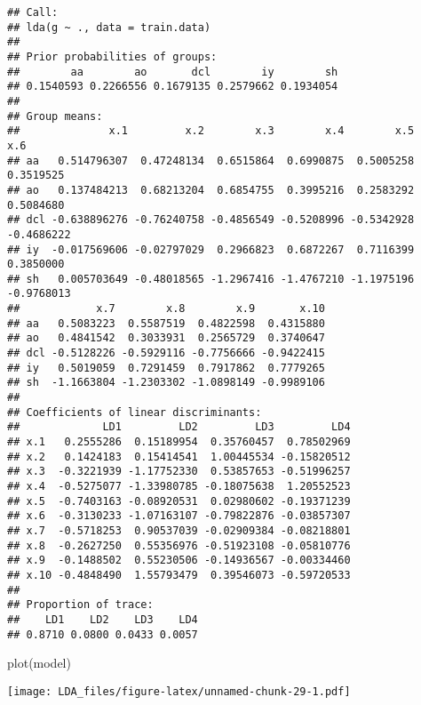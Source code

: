 \documentclass[
]{article}
\newenvironment{Shaded}{\begin{snugshade}}{\end{snugshade}}
\newcommand{\AttributeTok}[1]{\textcolor[rgb]{0.77,0.63,0.00}{#1}}
\newcommand{\DecValTok}[1]{\textcolor[rgb]{0.00,0.00,0.81}{#1}}
\newcommand{\DocumentationTok}[1]{\textcolor[rgb]{0.56,0.35,0.01}{\textbf{\textit{#1}}}}
\newcommand{\FunctionTok}[1]{\textcolor[rgb]{0.00,0.00,0.00}{#1}}
\newcommand{\NormalTok}[1]{#1}
\newcommand{\OtherTok}[1]{\textcolor[rgb]{0.56,0.35,0.01}{#1}}
\newcommand{\SpecialCharTok}[1]{\textcolor[rgb]{0.00,0.00,0.00}{#1}}
\begin{document}
\begin{verbatim}
## Call:
## lda(g ~ ., data = train.data)
## 
## Prior probabilities of groups:
##        aa        ao       dcl        iy        sh 
## 0.1540593 0.2266556 0.1679135 0.2579662 0.1934054 
## 
## Group means:
##              x.1         x.2        x.3        x.4        x.5        x.6
## aa   0.514796307  0.47248134  0.6515864  0.6990875  0.5005258  0.3519525
## ao   0.137484213  0.68213204  0.6854755  0.3995216  0.2583292  0.5084680
## dcl -0.638896276 -0.76240758 -0.4856549 -0.5208996 -0.5342928 -0.4686222
## iy  -0.017569606 -0.02797029  0.2966823  0.6872267  0.7116399  0.3850000
## sh   0.005703649 -0.48018565 -1.2967416 -1.4767210 -1.1975196 -0.9768013
##            x.7        x.8        x.9       x.10
## aa   0.5083223  0.5587519  0.4822598  0.4315880
## ao   0.4841542  0.3033931  0.2565729  0.3740647
## dcl -0.5128226 -0.5929116 -0.7756666 -0.9422415
## iy   0.5019059  0.7291459  0.7917862  0.7779265
## sh  -1.1663804 -1.2303302 -1.0898149 -0.9989106
## 
## Coefficients of linear discriminants:
##             LD1         LD2         LD3         LD4
## x.1   0.2555286  0.15189954  0.35760457  0.78502969
## x.2   0.1424183  0.15414541  1.00445534 -0.15820512
## x.3  -0.3221939 -1.17752330  0.53857653 -0.51996257
## x.4  -0.5275077 -1.33980785 -0.18075638  1.20552523
## x.5  -0.7403163 -0.08920531  0.02980602 -0.19371239
## x.6  -0.3130233 -1.07163107 -0.79822876 -0.03857307
## x.7  -0.5718253  0.90537039 -0.02909384 -0.08218801
## x.8  -0.2627250  0.55356976 -0.51923108 -0.05810776
## x.9  -0.1488502  0.55230506 -0.14936567 -0.00334460
## x.10 -0.4848490  1.55793479  0.39546073 -0.59720533
## 
## Proportion of trace:
##    LD1    LD2    LD3    LD4 
## 0.8710 0.0800 0.0433 0.0057
\end{verbatim}

\begin{Shaded}
\begin{Highlighting}[]
\FunctionTok{plot}\NormalTok{(model)}
\end{Highlighting}
\end{Shaded}

\texttt{[image: LDA\_files/figure-latex/unnamed-chunk-29-1.pdf]}

\begin{Shaded}
\end{Shaded}
\end{document}
